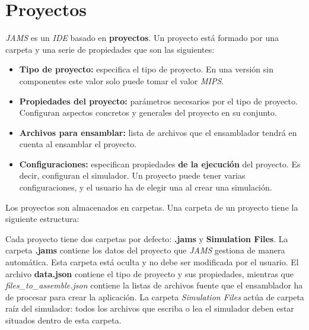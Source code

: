 \section{Proyectos}\label{sec:interfaz-grafica}

\textit{JAMS} es un \textit{IDE} basado en \textbf{proyectos}.
Un proyecto está formado por una carpeta y una serie de propiedades
que son las siguientes:
\begin{itemize}
    \item \textbf{Tipo de proyecto:} especifica el tipo de proyecto.
    En una versión sin componentes este valor solo puede tomar el valor \textit{MIPS}.
    \item \textbf{Propiedades del proyecto:} parámetros necesarios por el tipo de proyecto.
    Configuran aspectos concretos y generales del proyecto en su conjunto.
    \item \textbf{Archivos para ensamblar:} lista de archivos que el ensamblador tendrá en cuenta
    al ensamblar el proyecto.
    \item \textbf{Configuraciones:} especifican propiedades \textbf{de la ejecución} del proyecto.
    Es decir, configuran el simulador.
    Un proyecto puede tener varias configuraciones, y el usuario ha de elegir una al crear una
    simulación.
\end{itemize}

Los proyectos son almacenados en carpetas.
Una carpeta de un proyecto tiene la siguiente estructura:

\begin{center}
\end{center}

Cada proyecto tiene dos carpetas por defecto: \textbf{.jams} y
\textbf{Simulation Files}.
La carpeta \textbf{.jams} contiene los datos del proyecto que \textit{JAMS}
gestiona de manera automática.
Esta carpeta está oculta y no debe ser modificada por el usuario.
El archivo \textbf{data.json} contiene el tipo de proyecto y sus propiedades,
mientras que \textit{files\_to\_assemble.json} contiene la listas de archivos fuente
que el ensamblador ha de procesar para crear la aplicación.
La carpeta \textit{Simulation Files} actúa de carpeta raíz del simulador:
todos los archivos que escriba o lea el simulador deben estar situados dentro
de esta carpeta.
